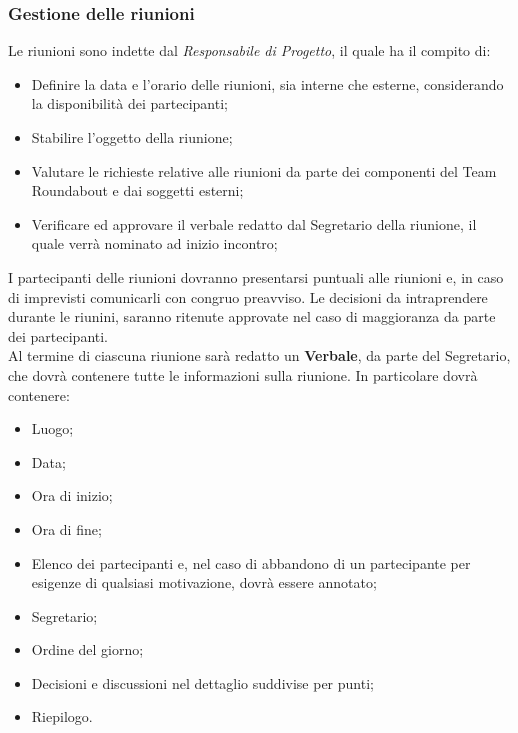 	\subsubsection{Gestione delle riunioni}
		Le riunioni sono indette dal \textit{Responsabile di Progetto}, il quale ha il compito di:
		\begin{itemize}
			\item Definire la data e l'orario delle riunioni, sia interne che esterne, considerando la disponibilità dei partecipanti;
			\item Stabilire l'oggetto della riunione;
			\item Valutare le richieste relative alle riunioni da parte dei componenti del Team Roundabout e dai soggetti esterni;
			\item Verificare ed approvare il verbale redatto dal Segretario della riunione, il quale verrà nominato ad inizio incontro;
		\end{itemize}
		I partecipanti delle riunioni dovranno presentarsi puntuali alle riunioni e, in caso di imprevisti comunicarli con congruo preavviso.
		Le decisioni da intraprendere durante le riunini, saranno ritenute approvate nel caso di maggioranza da parte dei partecipanti.\\
		Al termine di ciascuna riunione sarà redatto un \textbf{Verbale}, da parte del Segretario, che dovrà contenere tutte le informazioni sulla riunione. In particolare dovrà contenere:
		\begin{itemize}
			\item Luogo;
			\item Data;
			\item Ora di inizio;
			\item Ora di fine;
			\item Elenco dei partecipanti e, nel caso di abbandono di un partecipante per esigenze di qualsiasi motivazione, dovrà essere annotato;
			\item Segretario;
			\item Ordine del giorno;
			\item Decisioni e discussioni nel dettaglio suddivise per punti;
			\item Riepilogo.
		\end{itemize}
	
